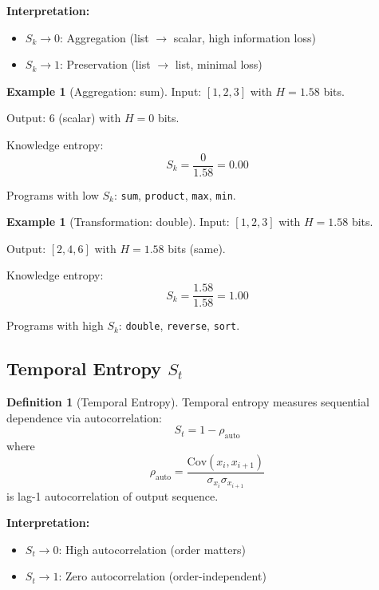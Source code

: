 \documentclass[twocolumn,10pt]{revtex4-2}
\theoremstyle{definition}
\newtheorem{definition}[theorem]{Definition}
\newtheorem{example}[theorem]{Example}
\theoremstyle{remark}
\newcommand{\Sk}{S_k}
\newcommand{\St}{S_t}
\begin{document}
\noindent\textbf{Interpretation:}
\begin{itemize}
\item $\Sk \to 0$: Aggregation (list $\to$ scalar, high information loss)
\item $\Sk \to 1$: Preservation (list $\to$ list, minimal loss)
\end{itemize}

\begin{example}[Aggregation: sum]
Input: $[1,2,3]$ with $H = 1.58$ bits.

Output: $6$ (scalar) with $H = 0$ bits.

Knowledge entropy:
\begin{equation}
\Sk = \frac{0}{1.58} = 0.00
\end{equation}

Programs with low $\Sk$: \texttt{sum}, \texttt{product}, \texttt{max}, \texttt{min}.
\end{example}

\begin{example}[Transformation: double]
Input: $[1,2,3]$ with $H = 1.58$ bits.

Output: $[2,4,6]$ with $H = 1.58$ bits (same).

Knowledge entropy:
\begin{equation}
\Sk = \frac{1.58}{1.58} = 1.00
\end{equation}

Programs with high $\Sk$: \texttt{double}, \texttt{reverse}, \texttt{sort}.
\end{example}

\subsection{Temporal Entropy $\St$}

\begin{definition}[Temporal Entropy]
\label{def:temporal_entropy}
Temporal entropy measures sequential dependence via autocorrelation:
\begin{equation}
\St = 1 - \rho_{\text{auto}}
\label{eq:temporal_entropy}
\end{equation}
where
\begin{equation}
\rho_{\text{auto}} = \frac{\text{Cov}(x_i, x_{i+1})}{\sigma_{x_i} \sigma_{x_{i+1}}}
\label{eq:autocorrelation}
\end{equation}
is lag-1 autocorrelation of output sequence.
\end{definition}

\noindent\textbf{Interpretation:}
\begin{itemize}
\item $\St \to 0$: High autocorrelation (order matters)
\item $\St \to 1$: Zero autocorrelation (order-independent)
\end{itemize}
\end{document}
